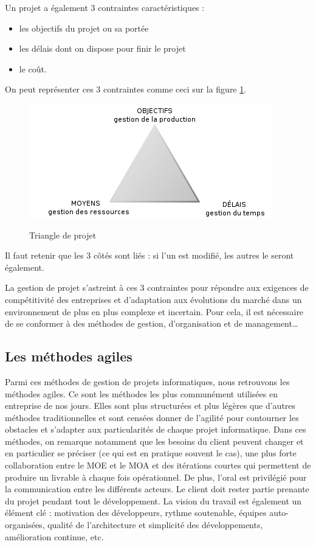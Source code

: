 \documentclass[12pt]{report}
\begin{document}
Un projet a également 3 contraintes caractéristiques :
\begin{itemize}
\item les objectifs du projet ou sa portée
\item les délais dont on dispose pour finir le projet
\item le coût\cite{wikigestion}.
\end{itemize}

On peut représenter ces 3 contraintes comme ceci sur la figure \ref{fig:trg}.
\begin{figure}[htp]
  \centering
  \includegraphics[scale=0.8]{images/triangle_projet}\cite{wikiprojet}
  \caption{Triangle de projet}
  \label{fig:trg}
\end{figure}

Il faut retenir que les 3 côtés sont liés : si l'un est modifié, les autres le seront également.

La gestion de projet s’astreint à ces 3 contraintes pour répondre aux exigences de compétitivité des entreprises et d’adaptation aux évolutions du marché dans un environnement de plus en plus complexe et incertain\cite{coursiut}. Pour cela, il est nécessaire de se conformer à des méthodes de gestion, d'organisation et de management…

\subsection{Les méthodes agiles}

Parmi ces méthodes de gestion de projets informatiques, nous retrouvons les méthodes agiles. Ce sont les méthodes les plus communément utilisées en entreprise de nos jours\cite{coursiut}.
Elles sont plus structurées et plus légères que d'autres méthodes traditionnelles et sont censées donner de l'agilité pour contourner les obstacles et s'adapter aux particularités de chaque projet informatique.
Dans ces méthodes, on remarque notamment que les besoins du client peuvent changer et en particulier se préciser (ce qui est en pratique souvent le cas), une plus forte collaboration entre le MOE et le MOA et des itérations courtes qui permettent de produire un livrable à chaque fois opérationnel\cite{wikiscrum}. De plus, l'oral  est privilégié pour la communication entre les différents acteurs\cite{coursiut}. Le client doit rester partie prenante du projet pendant tout le développement.
La vision du travail est également un élément clé : motivation des développeurs, rythme soutenable, équipes auto-organisées, qualité de l'architecture et simplicité des développements, amélioration continue, etc.
\end{document}
